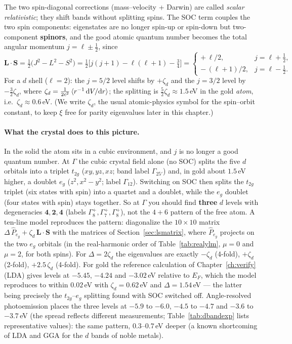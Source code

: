 The two spin-diagonal corrections (mass--velocity + Darwin) are called
\emph{scalar relativistic}; they shift bands without splitting spins. The SOC
term couples the two spin components: eigenstates are no longer spin-up or
spin-down but two-component \textbf{spinors}, and the good atomic quantum
number becomes the total angular momentum $j = \ell \pm \tfrac12$, since
\begin{equation}
\mathbf L \cdot \mathbf S
= \tfrac12\big(J^2 - L^2 - S^2\big)
= \tfrac12\Big[j(j{+}1) - \ell(\ell{+}1) - \tfrac34\Big]
= \begin{cases}
+\,\ell/2, & j = \ell + \tfrac12,\\[2pt]
-\,(\ell+1)/2, & j = \ell - \tfrac12 .
\end{cases}
\label{eq:ls_eigen}
\end{equation}
For a $d$ shell ($\ell=2$): the $j = 5/2$ level shifts by $+\zeta_d$ and
the $j = 3/2$ level by $-\tfrac32 \zeta_d$, where $\zeta_d = \tfrac{1}{2c^2}\braket{
r^{-1}\, \mathrm{d} V/\mathrm{d} r}$; the splitting is $\tfrac52 \zeta_d \approx 1.5$\,eV in
the gold \emph{atom}, i.e.\ $\zeta_d \approx 0.6$\,eV. (We write $\zeta_d$,
the usual atomic-physics symbol for the spin--orbit constant, to keep
$\xi$ free for parity eigenvalues later in this chapter.)

\paragraph{What the crystal does to this picture.} In the solid the atom
sits in a cubic environment, and $j$ is no longer a good quantum number. At
$\Gamma$ the cubic crystal field alone (no SOC) splits the five $d$
orbitals into a triplet $t_{2g}$ ($xy, yz, xz$; band label
$\Gamma_{25'}$) and, in gold about $1.5$\,eV higher, a doublet $e_g$
($z^2, x^2{-}y^2$; label $\Gamma_{12}$). Switching on SOC then splits the
$t_{2g}$ triplet (six states with spin) into a quartet and a doublet, while
the $e_g$ doublet (four states with spin) stays together. So at $\Gamma$
you should find \textbf{three} $d$ levels with degeneracies
$\mathbf{4, 2, 4}$ (labels $\Gamma_8^+, \Gamma_7^+, \Gamma_8^+$), not the
$4+6$ pattern of the free atom. A ten-line model reproduces the pattern:
diagonalize the $10\times10$ matrix $\Delta\,\hat P_{e_g} + \zeta_d\,\mathbf
L\cdot\mathbf S$ with the matrices of Section~\ref{sec:lsmatrix}, where
$\hat P_{e_g}$ projects on the two $e_g$ orbitals (in the real-harmonic
order of Table~\ref{tab:realylm}, $\mu = 0$ and $\mu = 2$, for both
spins). For $\Delta = 2\zeta_d$ the eigenvalues are exactly $-\zeta_d$ (4-fold),
$+\zeta_d$ (2-fold), $+2.5\,\zeta_d$ (4-fold). For gold the reference calculation
of Chapter~\ref{ch:verify} (LDA) gives levels at $-5.45$, $-4.24$ and
$-3.02$\,eV relative to $E_F$, which the model reproduces to within $0.02$\,eV
with $\zeta_d = 0.62$\,eV and $\Delta = 1.54$\,eV --- the latter being
precisely the $t_{2g}$--$e_g$ splitting found with SOC switched off.
Angle-resolved photoemission places the three levels at $-5.9$ to
$-6.0$, $-4.5$ to $-4.7$ and $-3.6$ to $-3.7$\,eV (the spread reflects different
measurements; Table~\ref{tab:dbandexp} lists representative values): the same pattern,
$0.3$--$0.7$\,eV deeper (a known shortcoming of LDA and GGA for the $d$
bands of noble metals).

